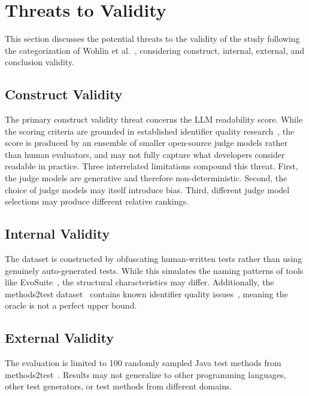 \documentclass[conference]{IEEEtran}
\begin{document}
\section{Threats to Validity}

This section discusses the potential threats to the validity of the study
following the categorization of Wohlin et al.~\cite{wohlin2012experimentation},
considering construct, internal, external, and conclusion validity.

\subsection{Construct Validity}

The primary construct validity threat concerns the LLM readability score.
While the scoring criteria are grounded in established identifier quality
research~\cite{scalabrino2018readability,lin2019quality}, the score is produced
by an ensemble of smaller open-source judge models rather than human evaluators,
and may not fully capture what developers consider readable in practice.
Three interrelated limitations compound this threat.
First, the judge models are generative and therefore non-deterministic.
Second, the choice of judge models may itself introduce bias.
Third, different judge model selections may produce different relative rankings.

\subsection{Internal Validity}

The dataset is constructed by obfuscating human-written tests rather than using
genuinely auto-generated tests.
While this simulates the naming patterns of tools like
EvoSuite~\cite{fraser2011evosuite}, the structural characteristics may differ.
Additionally, the methods2test dataset~\cite{tufano2022methods2test} contains
known identifier quality issues~\cite{lin2019quality}, meaning the oracle is
not a perfect upper bound.

\subsection{External Validity}

The evaluation is limited to 100 randomly sampled Java test methods from
methods2test~\cite{tufano2022methods2test}.
Results may not generalize to other programming languages, other test
generators, or test methods from different domains.
\end{document}
